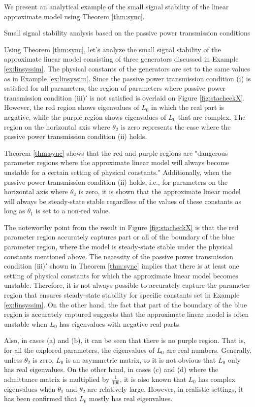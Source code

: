 \documentclass[graybox, envcountchap]{svmult}
\begin{document}
We present an analytical example of the small signal stability of the linear
approximate model using Theorem \ref{thm:sync}.

\begin{example}{Small signal stability analysis based on the passive power
transmission conditions}\label{ex:linthm}

Using Theorem \ref{thm:sync}, let's analyze the small signal stability of the
approximate linear model consisting of three generators discussed in Example
\ref{ex:linsyssim}. The physical constants of the generators are set to the same
values as in Example \ref{ex:linsyssim}. Since the passive power transmission
condition (i) is satisfied for all parameters, the region of parameters where
passive power transmission condition (iii)$'$ is not satisfied is overlaid on
Figure \ref{fig:stacheckX}. However, the red region shows eigenvalues of $L_0$
in which the real part is negative, while the purple region shows eigenvalues of
$L_0$ that are complex. The region on the horizontal axis where $\theta_2$ is
zero represents the case where the passive power transmission condition (ii)
holds.

Theorem \ref{thm:sync} shows that the red and purple regions are "dangerous
parameter regions where the approximate linear model will always become unstable
for a certain setting of physical constants." Additionally, when the passive
power transmission condition (ii) holds, i.e., for parameters on the horizontal
axis where $\theta_2$ is zero, it is shown that the approximate linear model
will always be steady-state stable regardless of the values of these constants
as long as $\theta_1$ is set to a non-red value.

The noteworthy point from the result in Figure \ref{fig:stacheckX} is that the
red parameter region accurately captures part or all of the boundary of the blue
parameter region, where the model is steady-state stable under the physical
constants mentioned above. The necessity of the passive power transmission
condition (iii)$'$ shown in Theorem \ref{thm:sync} implies that there is at
least one setting of physical constants for which the approximate linear model
becomes unstable. Therefore, it is not always possible to accurately capture the
parameter region that ensures steady-state stability for specific constants set
in Example \ref{ex:linsyssim}. On the other hand, the fact that part of the
boundary of the blue region is accurately captured suggests that the approximate
linear model is often unstable when $L_0$ has eigenvalues with negative real
parts.

Also, in cases (a) and (b), it can be seen that there is no purple region.  That
is, for all the explored parameters, the eigenvalues of $L_0$ are real numbers.
Generally, unless $\theta_2$ is zero, $L_0$ is an asymmetric matrix, so it is
not obvious that $L_0$ only has real eigenvalues. On the other hand, in cases
(c) and (d) where the admittance matrix is multiplied by $\frac{1}{100}$, it is
also known that $L_0$ has complex eigenvalues when $\theta_1$ and $\theta_2$ are
relatively large. However, in realistic settings, it has been confirmed that
$L_0$ mostly has real eigenvalues.
\end{example}
\end{document}
